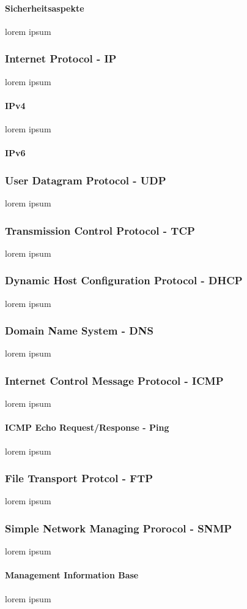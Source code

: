 \documentclass[10pt,a4paper]{report}
\begin{document}
\paragraph{Sicherheitsaspekte}
lorem ipsum
\subsubsection{Internet Protocol - IP}
lorem ipsum
\paragraph{IPv4}
lorem ipsum
\paragraph{IPv6}
\subsubsection{User Datagram Protocol - UDP}
lorem ipsum
\subsubsection{Transmission Control Protocol - TCP}
lorem ipsum
\subsubsection{Dynamic Host Configuration Protocol - DHCP}
lorem ipsum
\subsubsection{Domain Name System - DNS}
lorem ipsum
\subsubsection{Internet Control Message Protocol - ICMP}
lorem ipsum 
\paragraph{ICMP Echo Request/Response - Ping}
lorem ipsum
\subsubsection{File Transport Protcol - FTP}
lorem ipsum
\subsubsection{Simple Network Managing Prorocol - SNMP}
lorem ipsum
\paragraph{Management Information Base}
lorem ipsum
\end{document}
